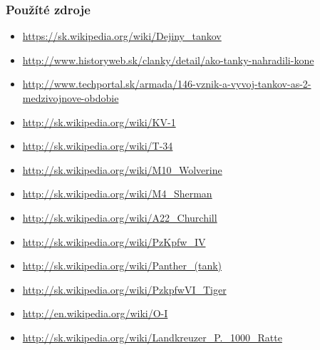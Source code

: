 \documentclass{beamer}
\begin{document}
	\begin{frame}
		\frametitle{Použíté zdroje}
		\footnotesize
		\begin{itemize}
			\item \url{https://sk.wikipedia.org/wiki/Dejiny_tankov}
			\item \url{http://www.historyweb.sk/clanky/detail/ako-tanky-nahradili-kone}
			\item \url{http://www.techportal.sk/armada/146-vznik-a-vyvoj-tankov-as-2-medzivojnove-obdobie}
			\item \url{http://sk.wikipedia.org/wiki/KV-1}
			\item \url{http://sk.wikipedia.org/wiki/T-34}
			\item \url{http://sk.wikipedia.org/wiki/M10_Wolverine}
			\item \url{http://sk.wikipedia.org/wiki/M4_Sherman}
			\item \url{http://sk.wikipedia.org/wiki/A22_Churchill}
			\item \url{http://sk.wikipedia.org/wiki/PzKpfw_IV}
			\item \url{http://sk.wikipedia.org/wiki/Panther_(tank)}
			\item \url{http://sk.wikipedia.org/wiki/PzkpfwVI_Tiger}
			\item \url{http://en.wikipedia.org/wiki/O-I}
			\item \url{http://sk.wikipedia.org/wiki/Landkreuzer_P._1000_Ratte}
		\end{itemize}
	\end{frame}
	
\end{document}

